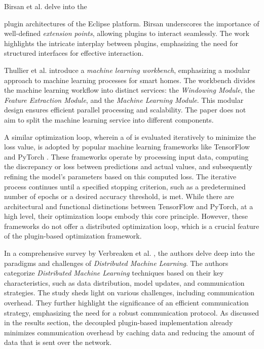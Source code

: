 \documentclass[
  a4paper,  %
  twoside,  %
  bibliography=totoc,
  headsepline,
  cleardoublepage=empty,
  parskip=half,
  draft=false
]{scrbook}
\begin{document}
Birsan et al. \cite{Birsan2005} delve into the {plugin architectures of the Eclipse platform.
Birsan underscores the importance of well-defined \emph{extension points}, allowing plugins to interact seamlessly.
The work highlights the intricate interplay between plugins, emphasizing the need for structured interfaces for effective interaction.

Thullier et al. \cite{Thullier2021} introduce a \emph{machine learning workbench}, emphasizing a modular approach to machine learning processes for smart homes.
The workbench divides the machine learning workflow into distinct services: the \emph{Windowing Module}, the \emph{Feature Extraction Module}, and the \emph{Machine Learning Module}.
This modular design ensures efficient parallel processing and scalability.
The paper does not aim to split the machine learning service into different components.

A similar optimization loop, wherein a \gls{of} is evaluated iteratively to minimize the loss value, is adopted by popular machine learning frameworks like TensorFlow \cite{Abadi2016} and PyTorch \cite{Paszke2019}.
These frameworks operate by processing input data, computing the discrepancy or loss between predictions and actual values, and subsequently refining the model's parameters based on this computed loss.
The iterative process continues until a specified stopping criterion, such as a predetermined number of epochs or a desired accuracy threshold, is met.
While there are architectural and functional distinctions between TensorFlow and PyTorch, at a high level, their optimization loops embody this core principle.
However, these frameworks do not offer a distributed optimization loop, which is a crucial feature of the plugin-based optimization framework.

In a comprehensive survey by Verbreaken et al. \cite{Verbraeken2020}, the authors delve deep into the paradigms and challenges of \emph{Distributed Machine Learning}.
The authors categorize \emph{Distributed Machine Learning} techniques based on their key characteristics, such as data distribution, model updates, and communication strategies.
The study sheds light on various challenges, including communication overhead.
They further highlight the significance of an efficient communication strategy, emphasizing the need for a robust communication protocol.
As discussed in the results section, the decoupled plugin-based implementation already minimizes communication overhead by caching data and reducing the amount of data that is sent over the network.

}
\end{document}
